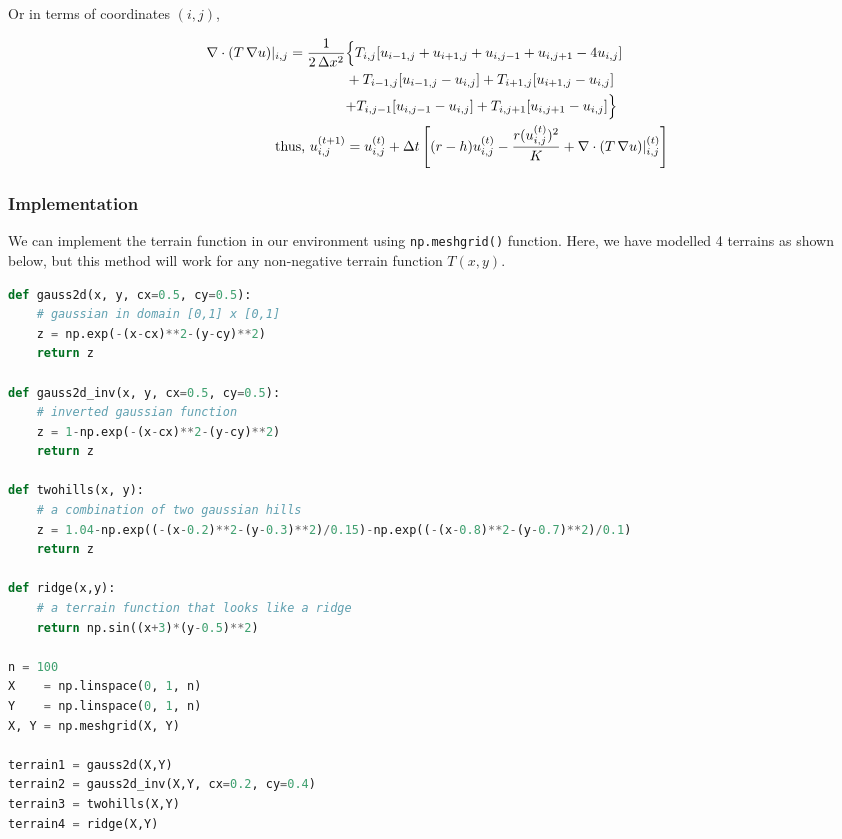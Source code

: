 Or in terms of coordinates $(i,j)$,

\begin{align}
\nabla \cdot (T\,\nabla u)|_{i,j} = \frac{1}{2\,\Delta x^2} & \Bigl\{ T_{i,j} [u_{i-1,j}+u_{i+1,j}+u_{i,j-1}+u_{i,j+1}-4u_{i,j}] \Bigl. \nonumber
\\ &+T_{i-1,j}[u_{i-1,j}-u_{i,j}] + T_{i+1,j}[u_{i+1,j}-u_{i,j}] \nonumber\\ 
&\Bigl. +
T_{i,j-1}[u_{i,j-1}-u_{i,j}]+T_{i,j+1}[u_{i,j+1}-u_{i,j}]\Bigl\}\\
\text{thus, }u_{i,j}^{(t+1)} &= u_{i,j}^{(t)} + \Delta t\left[(r-h)u_{i,j}^{(t)} - \frac{r(u_{i,j}^{(t)})^2}{K} + \nabla \cdot (T\,\nabla u)|_{i,j}^{(t)}\right]
\end{align}

\subsubsection{Implementation}
We can implement the terrain function in our environment using \verb|np.meshgrid()| function. Here, we have modelled 4 terrains as shown below, but this method will work for any non-negative terrain function $T(x,y)$.

\begin{lstlisting}[language=Python, caption=Code to model the rough terrains]
def gauss2d(x, y, cx=0.5, cy=0.5):
    # gaussian in domain [0,1] x [0,1]
    z = np.exp(-(x-cx)**2-(y-cy)**2)
    return z

def gauss2d_inv(x, y, cx=0.5, cy=0.5):
    # inverted gaussian function
    z = 1-np.exp(-(x-cx)**2-(y-cy)**2)
    return z

def twohills(x, y):
    # a combination of two gaussian hills
    z = 1.04-np.exp((-(x-0.2)**2-(y-0.3)**2)/0.15)-np.exp((-(x-0.8)**2-(y-0.7)**2)/0.1)
    return z

def ridge(x,y):
    # a terrain function that looks like a ridge
    return np.sin((x+3)*(y-0.5)**2)

n = 100
X    = np.linspace(0, 1, n)
Y    = np.linspace(0, 1, n)
X, Y = np.meshgrid(X, Y)

terrain1 = gauss2d(X,Y)
terrain2 = gauss2d_inv(X,Y, cx=0.2, cy=0.4)
terrain3 = twohills(X,Y)
terrain4 = ridge(X,Y)
\end{lstlisting}

